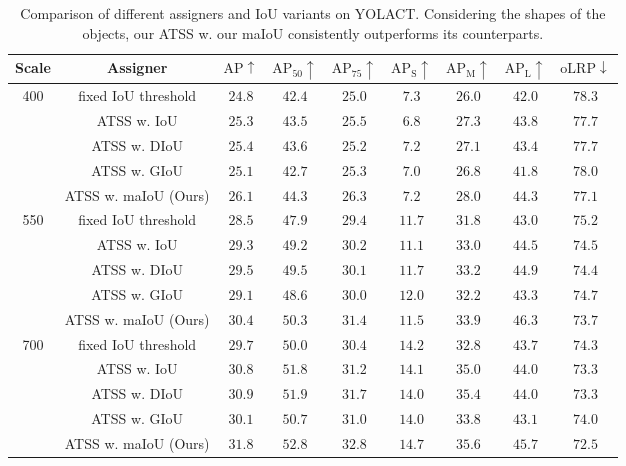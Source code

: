\documentclass{bmvc2k}
\begin{document}
\begin{table}
    \centering
    \small
    \setlength{\tabcolsep}{0.35em}
    \caption{Comparison of different assigners and IoU variants on YOLACT. Considering the shapes of the objects, our ATSS w. our maIoU consistently outperforms its  counterparts.}
    \label{tab:minival}
    \begin{tabular}{|c|c|c|c|c|c|c|c|c|} \hline
        Scale & Assigner & $\mathrm{AP} \uparrow$ & $\mathrm{AP_{50}} \uparrow$ & $\mathrm{AP_{75}} \uparrow$ & $\mathrm{AP_{S}} \uparrow$ & $\mathrm{AP_{M}} \uparrow$ & $\mathrm{AP_{L}} \uparrow$ & $\mathrm{oLRP} \downarrow$ \\ \hline
    \multirow{5}{*}{400}&fixed IoU threshold&$24.8$&$42.4$&$25.0$&$\mathbf{7.3}$&$26.0$&$42.0$&$78.3$ \\
    &ATSS w. IoU&$25.3$&$43.5$&$25.5$&$6.8$&$27.3$&$43.8$&$77.7$ \\
    &ATSS w. DIoU&$25.4$&$43.6$&$25.2$&$7.2$&$27.1$&$43.4$&$77.7$ \\
    &ATSS w. GIoU&$25.1$&$42.7$&$25.3$&$7.0$&$26.8$&$41.8$&$78.0$ \\ \cline{2-9}
&ATSS w. maIoU (Ours)&$\mathbf{26.1}$&$\mathbf{44.3}$&$\mathbf{26.3}$&$7.2$&$\mathbf{28.0}$&$\mathbf{44.3}$&$\mathbf{77.1}$\\ \hline \hline 
    \multirow{5}{*}{550} &fixed IoU threshold& $28.5$ & $47.9$ & $29.4$ & $11.7$ & $31.8$ & $43.0$ & $75.2$ \\
    & ATSS w. IoU&$29.3$& $49.2$ & $30.2$ & $11.1$ & $33.0$ & $44.5$ & $74.5$ \\
    &ATSS w. DIoU&$29.5$&$49.5$&$30.1$&$11.7$&$33.2$&$44.9$&$74.4$ \\
    &ATSS w. GIoU&$29.1$&$48.6$&$30.0$&$\mathbf{12.0}$&$32.2$&$43.3$&$74.7$ \\ \cline{2-9}
& ATSS w. maIoU (Ours)& $\mathbf{30.4}$& $\mathbf{50.3}$ & $\mathbf{31.4}$ & $11.5$ & $\mathbf{33.9}$ & $\mathbf{46.3}$ & $\mathbf{73.7}$ \\ \hline \hline 
    \multirow{5}{*}{700} &fixed IoU threshold&$29.7$&$50.0$&$30.4$&$14.2$&$32.8$&$43.7$&$74.3$\\
    & ATSS w. IoU&$30.8$&$51.8$&$31.2$&$14.1$&$35.0$&$44.0$&$73.3$\\
    &ATSS w. DIoU&$30.9$&$51.9$&$31.7$&$14.0$&$35.4$&$44.0$&$73.3$ \\
    &ATSS w. GIoU&$30.1$&$50.7$&$31.0$&$14.0$&$33.8$&$43.1$&$74.0$ \\ \cline{2-9}
    & ATSS w. maIoU (Ours)&$\mathbf{31.8}$&$\mathbf{52.8}$&$\mathbf{32.8}$&$\mathbf{14.7}$&$\mathbf{35.6}$&$\mathbf{45.7}$&$\mathbf{72.5}$\\ \hline 
    \end{tabular}
\end{table}
\label{subsec:Ablation}
\end{document}
